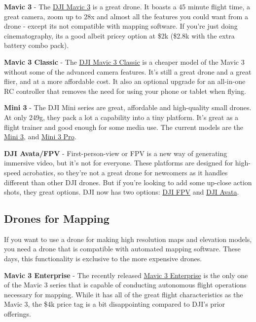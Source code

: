 \documentclass[
  12pt,
]{book}
\begin{document}
\textbf{Mavic 3} - The \href{https://store.dji.com/product/dji-mavic-3}{DJI Mavic 3} is a great drone. It boasts a 45 minute flight time, a great camera, zoom up to 28x and almost all the features you could want from a drone - except its not compatible with mapping software. If you're just doing cinematography, its a good albeit pricey option at \$2k (\$2.8k with the extra battery combo pack).

\textbf{Mavic 3 Classic} - The \href{https://store.dji.com/product/dji-mavic-3-classic}{DJI Mavic 3 Classic} is a cheaper model of the Mavic 3 without some of the advanced camera features. It's still a great drone and a great flier, and at a more affordable cost. It also an optional upgrade for an all-in-one RC controller that removes the need for using your phone or tablet when flying.

\textbf{Mini 3} - The DJI Mini series are great, affordable and high-quality small drones. At only 249g, they pack a lot a capability into a tiny platform. It's great as a flight trainer and good enough for some media use. The current models are the \href{https://store.dji.com/product/dji-mini-3}{Mini 3}, and \href{https://store.dji.com/product/dji-mini-3-pro}{Mini 3 Pro}.

\textbf{DJI Avata/FPV} - First-person-view or FPV is a new way of generating immersive video, but it's not for everyone. These platforms are designed for high-speed acrobatics, so they're not a great drone for newcomers as it handles different than other DJI drones. But if you're looking to add some up-close action shots, they great options. DJI now has two options: \href{https://store.dji.com/product/dji-fpv}{DJI FPV} and \href{https://store.dji.com/product/dji-avata}{DJI Avata}.

\hypertarget{drones-for-mapping}{%
\subsection{Drones for Mapping}\label{drones-for-mapping}}

If you want to use a drone for making high resolution maps and elevation models, you need a drone that is compatible with automated mapping software. These days, this functionality is exclusive to the more expensive drones.

\textbf{Mavic 3 Enterprise} - The recently released \href{https://store.dji.com/product/dji-mavic-3e-and-dji-care-enterprise-basic}{Mavic 3 Enterprise} is the only one of the Mavic 3 series that is capable of conducting autonomous flight operations necessary for mapping. While it has all of the great flight characteristics as the Mavic 3, the \$4k price tag is a bit disappointing compared to DJI's prior offerings.
\end{document}

